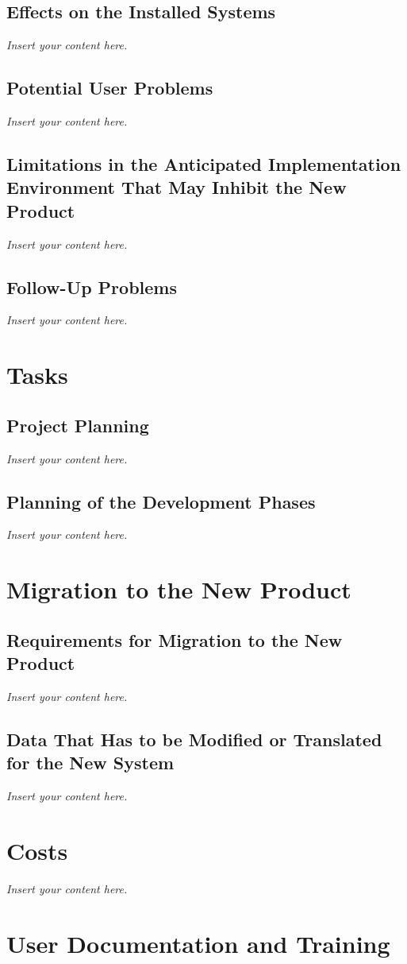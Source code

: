 \documentclass[12pt]{article}
\newcommand{\lips}{\textit{Insert your content here.}}
\begin{document}
\subsection{Effects on the Installed Systems}
\lips
\subsection{Potential User Problems}
\lips
\subsection{Limitations in the Anticipated Implementation Environment That May
Inhibit the New Product}
\lips
\subsection{Follow-Up Problems}
\lips

\section{Tasks}
\subsection{Project Planning}
\lips
\subsection{Planning of the Development Phases}
\lips

\section{Migration to the New Product}
\subsection{Requirements for Migration to the New Product}
\lips
\subsection{Data That Has to be Modified or Translated for the New System}
\lips

\section{Costs}
\lips
\section{User Documentation and Training}
\end{document}
